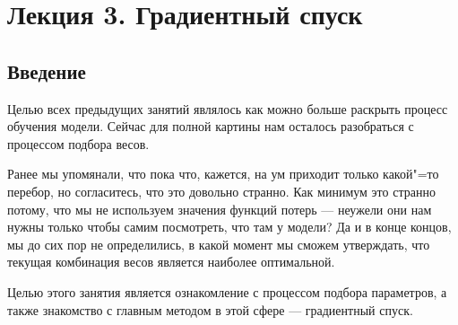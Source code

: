 \section*{Лекция 3. Градиентный спуск}
\subsection* {Введение}

Целью всех предыдущих занятий являлось как можно больше раскрыть процесс обучения модели. Сейчас для полной картины нам осталось разобраться с процессом подбора весов.

Ранее мы упомянали, что пока что, кажется, на ум приходит только какой"=то перебор, но согласитесь, что это довольно странно. Как минимум это странно потому, что мы не используем значения функций потерь --- неужели они нам нужны только чтобы самим посмотреть, что там у модели? Да и в конце концов, мы до сих пор не определились, в какой момент мы сможем утверждать, что текущая комбинация весов является наиболее оптимальной.

Целью этого занятия является ознакомление с процессом подбора параметров, а также знакомство с главным методом в этой сфере --- градиентный спуск.